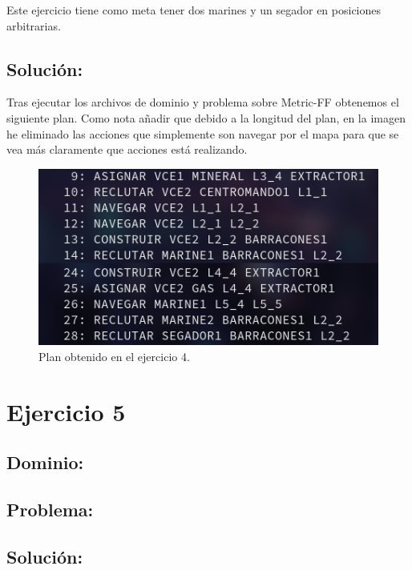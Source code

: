 \documentclass[11pt, spanish]{article}
\begin{document}
Este ejercicio tiene como meta tener dos marines y un segador en posiciones arbitrarias.

\subsection{Solución:}

Tras ejecutar los archivos de dominio y problema sobre Metric-FF obtenemos el siguiente plan. Como nota añadir que debido a la longitud del plan, en la imagen he eliminado las acciones que simplemente son navegar por el mapa para que se vea más claramente que acciones está realizando.

\begin{figure}[H]
	\centering
	\includegraphics[scale=0.4]{plan4.png}
	\caption{Plan obtenido en el ejercicio 4.}
	\label{plan4}
\end{figure}








\section{Ejercicio 5}


\subsection{Dominio:}


\subsection{Problema:}

\subsection{Solución:}
\end{document}
